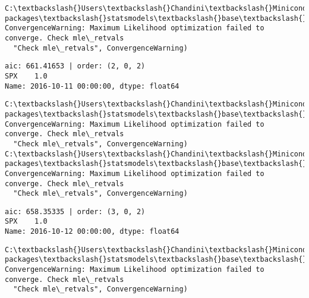 \documentclass[11pt]{article}
\begin{document}
    \begin{Verbatim}[commandchars=\\\{\}]
C:\textbackslash{}Users\textbackslash{}Chandini\textbackslash{}Miniconda3\textbackslash{}envs\textbackslash{}auquan\textbackslash{}lib\textbackslash{}site-packages\textbackslash{}statsmodels\textbackslash{}base\textbackslash{}model.py:496: ConvergenceWarning: Maximum Likelihood optimization failed to converge. Check mle\_retvals
  "Check mle\_retvals", ConvergenceWarning)

    \end{Verbatim}

    \begin{Verbatim}[commandchars=\\\{\}]
aic: 661.41653 | order: (2, 0, 2)
SPX    1.0
Name: 2016-10-11 00:00:00, dtype: float64

    \end{Verbatim}

    \begin{Verbatim}[commandchars=\\\{\}]
C:\textbackslash{}Users\textbackslash{}Chandini\textbackslash{}Miniconda3\textbackslash{}envs\textbackslash{}auquan\textbackslash{}lib\textbackslash{}site-packages\textbackslash{}statsmodels\textbackslash{}base\textbackslash{}model.py:496: ConvergenceWarning: Maximum Likelihood optimization failed to converge. Check mle\_retvals
  "Check mle\_retvals", ConvergenceWarning)
C:\textbackslash{}Users\textbackslash{}Chandini\textbackslash{}Miniconda3\textbackslash{}envs\textbackslash{}auquan\textbackslash{}lib\textbackslash{}site-packages\textbackslash{}statsmodels\textbackslash{}base\textbackslash{}model.py:496: ConvergenceWarning: Maximum Likelihood optimization failed to converge. Check mle\_retvals
  "Check mle\_retvals", ConvergenceWarning)

    \end{Verbatim}

    \begin{Verbatim}[commandchars=\\\{\}]
aic: 658.35335 | order: (3, 0, 2)
SPX    1.0
Name: 2016-10-12 00:00:00, dtype: float64

    \end{Verbatim}

    \begin{Verbatim}[commandchars=\\\{\}]
C:\textbackslash{}Users\textbackslash{}Chandini\textbackslash{}Miniconda3\textbackslash{}envs\textbackslash{}auquan\textbackslash{}lib\textbackslash{}site-packages\textbackslash{}statsmodels\textbackslash{}base\textbackslash{}model.py:496: ConvergenceWarning: Maximum Likelihood optimization failed to converge. Check mle\_retvals
  "Check mle\_retvals", ConvergenceWarning)

    \end{Verbatim}
\end{document}
